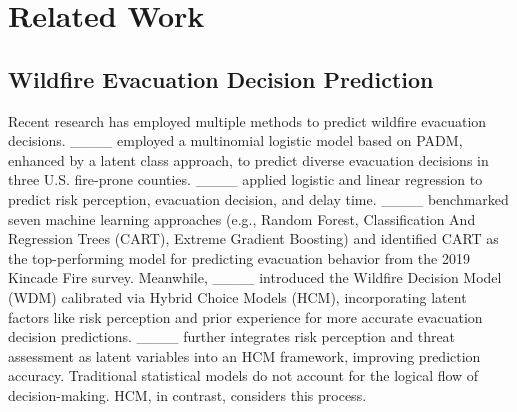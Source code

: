 \section{Related Work}
\vspace{-0.2cm}

\subsection{Wildfire Evacuation Decision Prediction}
\vspace{-0.2cm}
Recent research has employed multiple methods to predict wildfire evacuation decisions.
____ employed a multinomial logistic model based on PADM, enhanced by a latent class approach, to predict diverse evacuation decisions in three U.S. fire-prone counties. 
____ applied logistic and linear regression to predict risk perception, evacuation decision, and delay time.
____ benchmarked seven machine learning approaches (e.g., Random Forest, Classification And Regression Trees (CART), Extreme Gradient Boosting) and identified CART as the top-performing model for predicting evacuation behavior from the 2019 Kincade Fire survey.
Meanwhile, ____ introduced the Wildfire Decision Model (WDM) calibrated via Hybrid Choice Models (HCM), incorporating latent factors like risk perception and prior experience for more accurate evacuation decision predictions.
____ further integrates risk perception and threat assessment as latent variables into an HCM framework, improving prediction accuracy.
Traditional statistical models do not account for the logical flow of decision-making. HCM, in contrast, considers this process.




\vspace{-0.2cm}
